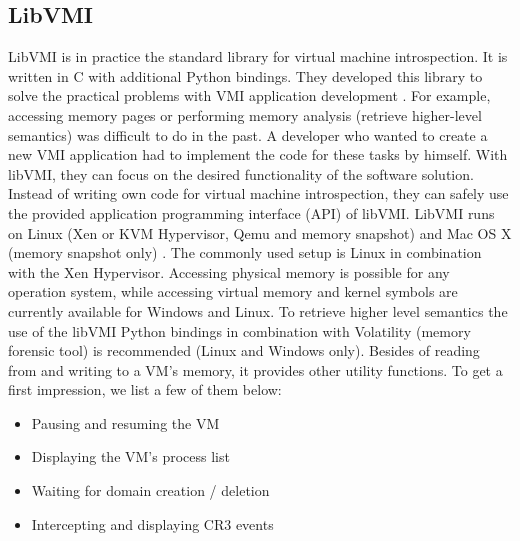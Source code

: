 \documentclass[sigconf]{acmart}
\begin{document}
\subsection{LibVMI}
LibVMI \cite{githublibvmi} is in practice the standard library for virtual machine introspection. It is written in C with additional Python bindings. They developed this library to solve the practical problems with VMI application development \cite{payne2012simplifying}. 
\newline
For example, accessing memory pages or performing memory analysis (retrieve higher-level semantics) was difficult to do in the past. A developer who wanted to create a new VMI application had to implement the code for these tasks by himself. With libVMI, they can focus on the desired functionality of the software solution. Instead of writing own code for virtual machine introspection, they can safely use the provided application programming interface (API) of libVMI.
\newline
\newline
LibVMI runs on Linux (Xen or KVM Hypervisor, Qemu and memory snapshot) and Mac OS X (memory snapshot only) \cite{libvmiwebsite}. The commonly used setup is Linux in combination with the Xen Hypervisor. Accessing physical memory is possible for any operation system, while accessing virtual memory and kernel symbols are currently available for Windows and Linux. To retrieve higher level semantics the use of the libVMI Python bindings in combination with Volatility (memory forensic tool) is recommended (Linux and Windows only).
\newline
Besides of reading from and writing to a VM's memory, it provides other utility functions. To get a first impression, we list a few of them below:
\newline
\begin{itemize}
	\item Pausing and resuming the VM
	\newline 
	\item Displaying the VM's process list 
	\newline
	\item Waiting for domain creation / deletion
	\newline
	\item Intercepting and displaying CR3 events
	\newline
\end{itemize}
\end{document}

